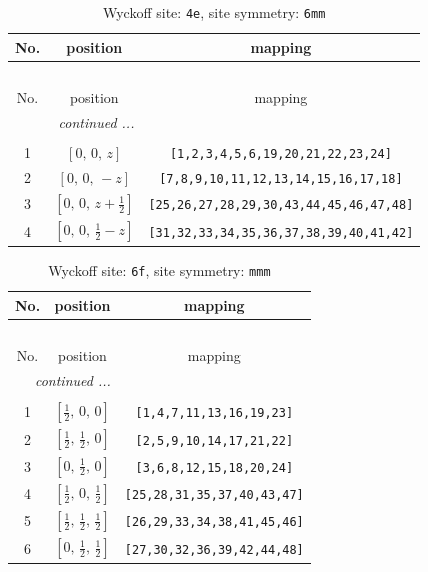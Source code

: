 \documentclass[fleqn,8pt]{jsarticle}
\begin{document}
\renewcommand{\arraystretch}{1.2}
\begin{longtable}{ccc}
\caption{Wyckoff site: {\tt 4e}, site symmetry: {\tt 6mm}}
 \\
 \hline \hline
No. & position & mapping \\ \hline \endfirsthead

\multicolumn{2}{l}{\tablename\ \thetable{}} \\
 \hline \hline
No. & position & mapping \\ \hline \endhead

 \hline \hline
\multicolumn{2}{r}{\footnotesize\it continued ...} \\ \endfoot

 \hline \hline
\multicolumn{2}{r}{} \\ \endlastfoot

1 & $\left[ 0,\, 0,\, z \right]$ & {\tt [1,2,3,4,5,6,19,20,21,22,23,24]} \\ \hline
2 & $\left[ 0,\, 0,\, - z \right]$ & {\tt [7,8,9,10,11,12,13,14,15,16,17,18]} \\ \hline
3 & $\left[ 0,\, 0,\, z + \frac{1}{2} \right]$ & {\tt [25,26,27,28,29,30,43,44,45,46,47,48]} \\ \hline
4 & $\left[ 0,\, 0,\, \frac{1}{2} - z \right]$ & {\tt [31,32,33,34,35,36,37,38,39,40,41,42]} \\
\end{longtable}
\renewcommand{\arraystretch}{1.2}
\begin{longtable}{ccc}
\caption{Wyckoff site: {\tt 6f}, site symmetry: {\tt mmm}}
 \\
 \hline \hline
No. & position & mapping \\ \hline \endfirsthead

\multicolumn{2}{l}{\tablename\ \thetable{}} \\
 \hline \hline
No. & position & mapping \\ \hline \endhead

 \hline \hline
\multicolumn{2}{r}{\footnotesize\it continued ...} \\ \endfoot

 \hline \hline
\multicolumn{2}{r}{} \\ \endlastfoot

1 & $\left[ \frac{1}{2},\, 0,\, 0 \right]$ & {\tt [1,4,7,11,13,16,19,23]} \\ \hline
2 & $\left[ \frac{1}{2},\, \frac{1}{2},\, 0 \right]$ & {\tt [2,5,9,10,14,17,21,22]} \\ \hline
3 & $\left[ 0,\, \frac{1}{2},\, 0 \right]$ & {\tt [3,6,8,12,15,18,20,24]} \\ \hline
4 & $\left[ \frac{1}{2},\, 0,\, \frac{1}{2} \right]$ & {\tt [25,28,31,35,37,40,43,47]} \\ \hline
5 & $\left[ \frac{1}{2},\, \frac{1}{2},\, \frac{1}{2} \right]$ & {\tt [26,29,33,34,38,41,45,46]} \\ \hline
6 & $\left[ 0,\, \frac{1}{2},\, \frac{1}{2} \right]$ & {\tt [27,30,32,36,39,42,44,48]} \\
\end{longtable}
\end{document}

